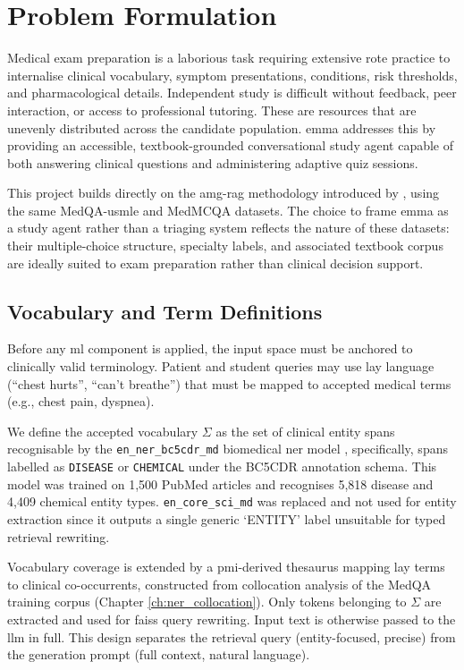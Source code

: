 \chapter{Problem Formulation}

Medical exam preparation is a laborious task requiring extensive rote practice to internalise clinical vocabulary, symptom presentations, conditions, risk thresholds, and pharmacological details. Independent study is difficult without feedback, peer interaction, or access to professional tutoring. These are resources that are unevenly distributed across the candidate population. \gls{emma} addresses this by providing an accessible, textbook-grounded conversational study agent capable of both answering clinical questions and administering adaptive quiz sessions. 

This project builds directly on the \gls{amg-rag} methodology introduced by \citet{rezaei2025}, using the same MedQA-\gls{usmle} and MedMCQA datasets. The choice to frame \gls{emma} as a study agent rather than a triaging system reflects the nature of these datasets: their multiple-choice structure, specialty labels, and associated textbook corpus are ideally suited to exam preparation rather than clinical decision support.

\section{Vocabulary and Term Definitions}

Before any \gls{ml} component is applied, the input space must be anchored to clinically valid terminology. Patient and student queries may use lay language (``chest hurts'', ``can't breathe'') that must be mapped to accepted medical terms (e.g., chest pain, dyspnea).

We define the accepted vocabulary $\Sigma$ as the set of clinical entity spans recognisable by the \texttt{en\_ner\_bc5cdr\_md} biomedical \gls{ner} model \cite{neumann2019}, specifically, spans labelled as \texttt{DISEASE} or \texttt{CHEMICAL} under the BC5CDR annotation schema. This model was trained on 1,500 PubMed articles and recognises 5,818 disease and 4,409 chemical entity types. \texttt{en\_core\_sci\_md} was replaced and not used for entity extraction since it outputs a single generic `ENTITY' label unsuitable for typed retrieval rewriting. 

Vocabulary coverage is extended by a \gls{pmi}-derived thesaurus mapping lay terms to clinical co-occurrents, constructed from collocation analysis of the MedQA training corpus (Chapter \ref{ch:ner_collocation}). Only tokens belonging to $\Sigma$ are extracted and used for \gls{faiss} query rewriting. Input text is otherwise passed to the \gls{llm} in full. This design separates the retrieval query (entity-focused, precise) from the generation prompt (full context, natural language).

